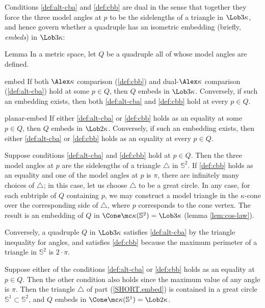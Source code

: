 Conditions \ref{def:alt-cba} and \ref{def:cbb} are dual in the sense that together they force the three model angles at $p$ to be the sidelengths of a triangle in $\Lob3\kappa$, and hence  govern whether a quadruple has an isometric embedding (briefly, \emph{embeds}) in $\Lob3\kappa$:


\begin{thm}{Lemma}
\label{lem:embedding-angles} 
In a metric space, let $Q$ be a  quadruple all of whose model angles are defined.
\begin{subthm}{embed}
If both $\Alex\kappa$ comparison (\ref{def:cbb}) and dual-$\Alex\kappa$ comparison (\ref{def:alt-cba}) hold at some $p\in Q$, then $Q$ embeds in $\Lob3\kappa$. 
Conversely, if such an embedding exists, then both \ref{def:alt-cba} and \ref{def:cbb} hold at every $p\in Q$. 
\end{subthm}
\begin{subthm}{planar-embed}
If either \ref{def:alt-cba} or \ref{def:cbb} holds as an equality at some $p\in Q$, then 
$Q$ embeds in  $\Lob2\kappa$.  Conversely, if such an embedding exists, then either \ref{def:alt-cba} or \ref{def:cbb} holds as an equality at every $p\in Q$.
\end{subthm}
\end{thm}


 Suppose conditions  \ref{def:alt-cba} and \ref{def:cbb} hold at $p\in Q$.  Then the three model angles at $p$ are the sidelengths of a triangle $\triangle$ in $\mathbb{S}^2$.  If  \ref{def:cbb} holds as an equality and one of the model angles at $p$ is $\pi$, there are infinitely many choices of $\triangle$;  in this case, let us choose $\triangle$ to be a great circle.   In any case, for each subtriple of $Q$ containing $p$, we may construct a model triangle in the $\kappa$-cone over the corresponding side of  $\triangle$, where $p$ corresponds to the cone vertex.  The result is an embedding of $Q$ in $\Cone\mc\kappa(\mathbb{S}^2) = \Lob3\kappa$ (lemma \ref{lem:cos-law}).

Conversely, a quadruple $Q$ in $\Lob3\kappa$ satisfies \ref{def:alt-cba} by the triangle inequality for angles, and  satisfies \ref{def:cbb} because the maximum perimeter of a triangle in $\mathbb{S}^2$ is $2\cdot\pi$.
 

 Suppose either of the conditions \ref{def:alt-cba} or \ref{def:cbb} holds as an equality at $p\in Q$. Then the other condition also holds since  the maximum value of any angle is $\pi$.  
Then the triangle $\triangle$ of part (\ref{SHORT.embed}) is contained in a great circle $\mathbb{S}^1\subset\mathbb{S}^2$, and $Q$ embeds in $\Cone\mc\kappa(\mathbb{S}^1)= \Lob2\kappa$. 

